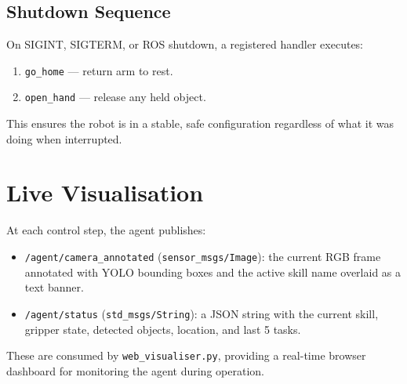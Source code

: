\subsection{Shutdown Sequence}

On SIGINT, SIGTERM, or ROS shutdown, a registered handler executes:
\begin{enumerate}[noitemsep]
  \item \texttt{go\_home} — return arm to rest.
  \item \texttt{open\_hand} — release any held object.
\end{enumerate}

This ensures the robot is in a stable, safe configuration regardless of what it was
doing when interrupted.

\section{Live Visualisation}

At each control step, the agent publishes:

\begin{itemize}[noitemsep]
  \item \texttt{/agent/camera\_annotated} (\texttt{sensor\_msgs/Image}): the current
        RGB frame annotated with YOLO bounding boxes and the active skill name overlaid
        as a text banner.
  \item \texttt{/agent/status} (\texttt{std\_msgs/String}): a JSON string with the
        current skill, gripper state, detected objects, location, and last 5 tasks.
\end{itemize}

These are consumed by \texttt{web\_visualiser.py}, providing a real-time browser
dashboard for monitoring the agent during operation.
